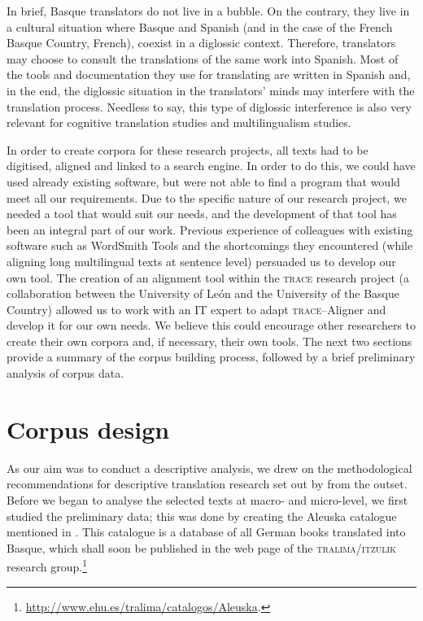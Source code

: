 \documentclass[output=paper]{LSP/langsci}
\begin{document}
In brief, Basque translators do not live in a bubble. On the contrary, they live in a cultural situation where Basque and Spanish (and in the case of the French Basque Country, French), coexist in a diglossic context. Therefore, translators may choose to consult the translations of the same work into Spanish. Most of the tools and documentation they use for translating are written in Spanish and, in the end, the diglossic situation in the translators’ minds may interfere with the translation process. Needless to say, this type of diglossic interference is also very relevant for cognitive translation studies and multilingualism studies.

In order to create corpora for these research projects, all texts had to be digitised, aligned and linked to a search engine. In order to do this, we could have used already existing software, but were not able to find a program that would meet all our requirements. Due to the specific nature of our research project, we needed a tool that would suit our needs, and the development of that tool has been an integral part of our work. Previous experience of colleagues with existing software such as WordSmith Tools and the shortcomings they encountered (while aligning long multilingual texts at sentence level) persuaded us to develop our own tool. The creation of an alignment tool within the \textsc{trace} research project (a collaboration between the University of León and the University of the Basque Country) allowed us to work with an IT expert to adapt \textsc{trace}--Aligner and develop it for our own needs. We believe this could encourage other researchers to create their own corpora and, if necessary, their own tools. The next two sections provide a summary of the corpus building process, followed by a brief preliminary analysis of corpus data.

\section{Corpus design}

As our aim was to conduct a descriptive analysis, we drew on the methodological recommendations for descriptive translation research set out by \citet{Lambert1985} from the outset. Before we began to analyse the selected texts at macro- and micro-level, we first studied the preliminary data; this was done by creating the Aleuska catalogue mentioned in . This catalogue is a database of all German books translated into Basque, which shall soon be published in the web page of the \textsc{tralima}/\textsc{itzulik} research group.\footnote{\url{http://www.ehu.es/tralima/catalogos/Aleuska}.}
\end{document}
